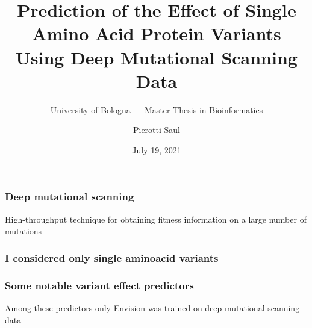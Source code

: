 \documentclass[10pt, british]{beamer}
\title[Single Aminoacid Variants Prediction]{Prediction of the Effect of Single Amino Acid Protein
	Variants\\Using Deep Mutational Scanning Data}
\subtitle[]{University of Bologna --- Master Thesis in Bioinformatics}
\author[Pierotti Saul]{Pierotti Saul}
\date{July 19, 2021}
\begin{document}
\begin{frame}[plain]
	\titlepage%
\end{frame}

\begin{frame}
	\frametitle{Deep mutational scanning}
	High-throughput technique for obtaining fitness information on a large number of mutations
	\vfill%
	\begin{figure}
		
	\end{figure}
\end{frame}

\begin{frame}
	\frametitle{I considered only single aminoacid variants}
	\vfill%
	\begin{figure}
		
	\end{figure}
\end{frame}

%		

%
%
%
%

\begin{frame}
	\frametitle{Some notable variant effect predictors}
	\begin{figure}
		
	\end{figure}
	\vfill%
	Among these predictors only Envision was trained on deep mutational scanning data
\end{frame}
\end{document}
